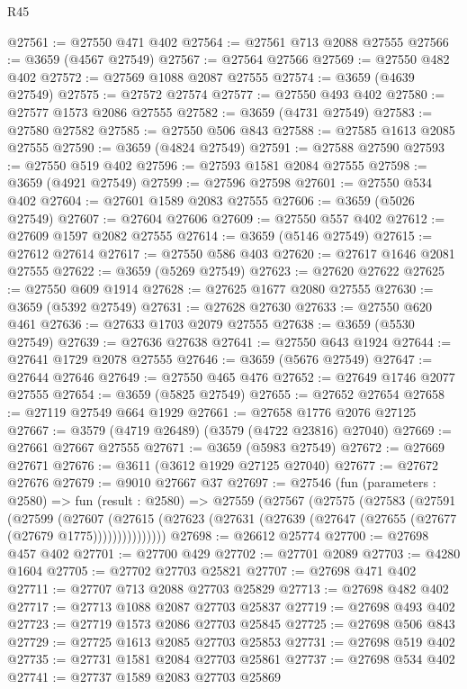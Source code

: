 \begin{lexlean}{R45}
\begin{coremodule}
@27561 := @27550 @471 @402
@27564 := @27561 @713 @2088 @27555
@27566 := @3659 (@4567 @27549)
@27567 := @27564 @27566
@27569 := @27550 @482 @402
@27572 := @27569 @1088 @2087 @27555
@27574 := @3659 (@4639 @27549)
@27575 := @27572 @27574
@27577 := @27550 @493 @402
@27580 := @27577 @1573 @2086 @27555
@27582 := @3659 (@4731 @27549)
@27583 := @27580 @27582
@27585 := @27550 @506 @843
@27588 := @27585 @1613 @2085 @27555
@27590 := @3659 (@4824 @27549)
@27591 := @27588 @27590
@27593 := @27550 @519 @402
@27596 := @27593 @1581 @2084 @27555
@27598 := @3659 (@4921 @27549)
@27599 := @27596 @27598
@27601 := @27550 @534 @402
@27604 := @27601 @1589 @2083 @27555
@27606 := @3659 (@5026 @27549)
@27607 := @27604 @27606
@27609 := @27550 @557 @402
@27612 := @27609 @1597 @2082 @27555
@27614 := @3659 (@5146 @27549)
@27615 := @27612 @27614
@27617 := @27550 @586 @403
@27620 := @27617 @1646 @2081 @27555
@27622 := @3659 (@5269 @27549)
@27623 := @27620 @27622
@27625 := @27550 @609 @1914
@27628 := @27625 @1677 @2080 @27555
@27630 := @3659 (@5392 @27549)
@27631 := @27628 @27630
@27633 := @27550 @620 @461
@27636 := @27633 @1703 @2079 @27555
@27638 := @3659 (@5530 @27549)
@27639 := @27636 @27638
@27641 := @27550 @643 @1924
@27644 := @27641 @1729 @2078 @27555
@27646 := @3659 (@5676 @27549)
@27647 := @27644 @27646
@27649 := @27550 @465 @476
@27652 := @27649 @1746 @2077 @27555
@27654 := @3659 (@5825 @27549)
@27655 := @27652 @27654
@27658 := @27119 @27549 @664 @1929
@27661 := @27658 @1776 @2076 @27125
@27667 := @3579 (@4719 @26489) (@3579 (@4722 @23816) @27040)
@27669 := @27661 @27667 @27555
@27671 := @3659 (@5983 @27549)
@27672 := @27669 @27671
@27676 := @3611 (@3612 @1929 @27125 @27040)
@27677 := @27672 @27676
@27679 := @9010 @27667 @37
@27697 := @27546
    (fun (parameters : @2580) =>
    fun (result : @2580) =>
    @27559
      (@27567
        (@27575
          (@27583
            (@27591
              (@27599
                (@27607
                  (@27615
                    (@27623 (@27631 (@27639 (@27647 (@27655 (@27677 (@27679 @1775)))))))))))))))
@27698 := @26612 @25774
@27700 := @27698 @457 @402
@27701 := @27700 @429
@27702 := @27701 @2089
@27703 := @4280 @1604
@27705 := @27702 @27703 @25821
@27707 := @27698 @471 @402
@27711 := @27707 @713 @2088 @27703 @25829
@27713 := @27698 @482 @402
@27717 := @27713 @1088 @2087 @27703 @25837
@27719 := @27698 @493 @402
@27723 := @27719 @1573 @2086 @27703 @25845
@27725 := @27698 @506 @843
@27729 := @27725 @1613 @2085 @27703 @25853
@27731 := @27698 @519 @402
@27735 := @27731 @1581 @2084 @27703 @25861
@27737 := @27698 @534 @402
@27741 := @27737 @1589 @2083 @27703 @25869

\end{coremodule}
\end{lexlean}
